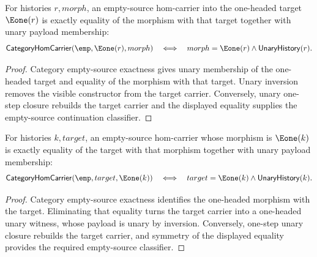 \begin{theorem}
\label{thm:category-hom-carrier-empty-source-e1-target-iff}
For histories $r,morph$, an empty-source hom-carrier into the one-headed
target $\Eone(r)$ is exactly equality of the morphism with that target
together with unary payload membership:
$$
\mathsf{CategoryHomCarrier}(\emp,\Eone(r),morph)
\quad\Longleftrightarrow\quad
morph=\Eone(r)\land\mathsf{UnaryHistory}(r).
$$
\end{theorem}
\begin{proof}
Category empty-source exactness gives unary membership of the one-headed target
and equality of the morphism with that target. Unary inversion removes the
visible constructor from the target carrier. Conversely, unary one-step closure
rebuilds the target carrier and the displayed equality supplies the
empty-source continuation classifier.
\end{proof}

\begin{theorem}
\label{thm:category-hom-carrier-empty-source-e1-morphism-iff}
For histories $k,target$, an empty-source hom-carrier whose morphism is
$\Eone(k)$ is exactly equality of the target with that morphism together with
unary payload membership:
$$
\mathsf{CategoryHomCarrier}(\emp,target,\Eone(k))
\quad\Longleftrightarrow\quad
target=\Eone(k)\land\mathsf{UnaryHistory}(k).
$$
\end{theorem}
\begin{proof}
Category empty-source exactness identifies the one-headed morphism with the
target. Eliminating that equality turns the target carrier into a one-headed
unary witness, whose payload is unary by inversion. Conversely, one-step unary
closure rebuilds the target carrier, and symmetry of the displayed equality
provides the required empty-source classifier.
\end{proof}

